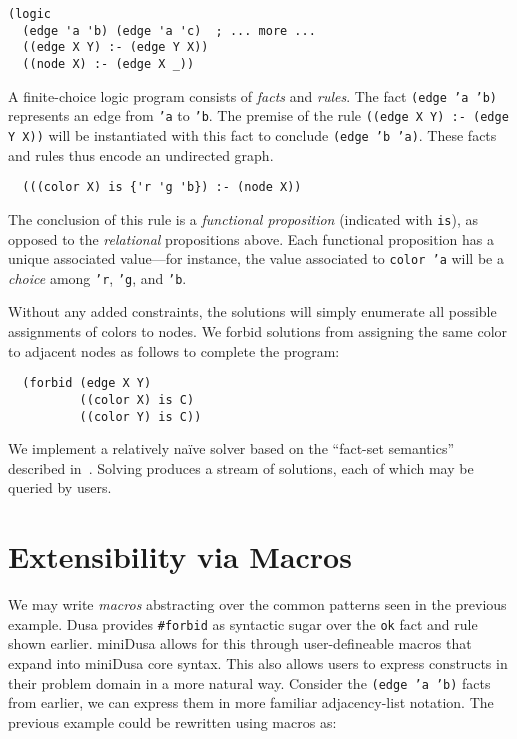 \documentclass[dvipsnames,sigplan,screen,review,anonymous,acmthm,nonacm]{acmart}
\begin{document}
\begin{verbatim}
(logic
  (edge 'a 'b) (edge 'a 'c)  ; ... more ...
  ((edge X Y) :- (edge Y X))
  ((node X) :- (edge X _))
\end{verbatim}
A finite-choice logic program consists of \emph{facts} and \emph{rules}.
The fact \texttt{(edge 'a 'b)} represents an edge from \texttt{'a} to \texttt{'b}.
The premise of the rule \texttt{((edge X Y) :- (edge Y X))} will be
instantiated with this fact to conclude \texttt{(edge 'b 'a)}.
These facts and rules thus encode an undirected graph.

\begin{verbatim}
  (((color X) is {'r 'g 'b}) :- (node X))
\end{verbatim}
The conclusion of this rule is a \emph{functional proposition}
(indicated with \texttt{is}), as opposed to the \emph{relational} propositions above.
Each functional proposition has a unique associated value---for instance,
the value associated to \texttt{color 'a} will be a
\emph{choice} among \texttt{'r}, \texttt{'g}, and \texttt{'b}.

Without any added constraints, the solutions will simply enumerate all
possible assignments of colors to nodes. We forbid solutions from
assigning the same color to adjacent nodes as follows to complete the \miniDusa{} program:

\begin{verbatim}
  (forbid (edge X Y)
          ((color X) is C)
          ((color Y) is C))
\end{verbatim}

We implement a relatively naïve solver based on the ``fact-set semantics''
described in~\cite{martens2025dusa}. Solving produces a stream of solutions,
each of which may be queried by users.

\section{Extensibility via Macros}

We may write \emph{macros} abstracting over the common patterns seen in the
previous example.
Dusa
provides \texttt{\#forbid} as syntactic sugar over the \texttt{ok} fact and rule
shown earlier. miniDusa allows for this through user-defineable macros that
expand into miniDusa core syntax. This also allows users to express constructs
in their problem domain in a more natural way. Consider the
\texttt{(edge 'a 'b)} facts from earlier, we can express them in more familiar
adjacency-list notation.
The previous example could be rewritten using macros as:
\end{document}
